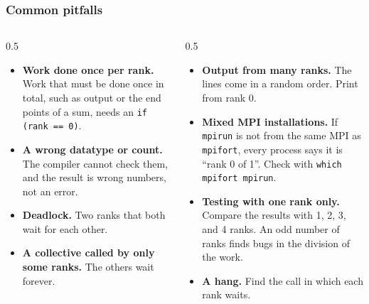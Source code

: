 \begin{frame}
  \frametitle{Common pitfalls}
  \begin{columns}[T]
    \begin{column}{0.5\textwidth}
      \begin{itemize}
        \item \textbf{Work done once per rank.} Work that must be done once in total, such as output or the end points of a sum, needs an \texttt{if (rank == 0)}.
        \item \textbf{A wrong datatype or count.} The compiler cannot check them, and the result is wrong numbers, not an error.
        \item \textbf{Deadlock.} Two ranks that both wait for each other.
        \item \textbf{A collective called by only some ranks.} The others wait forever.
      \end{itemize}
    \end{column}

    \begin{column}{0.5\textwidth}
      \begin{itemize}
        \item \textbf{Output from many ranks.} The lines come in a random order. Print from rank 0.
        \item \textbf{Mixed MPI installations.} If \texttt{mpirun} is not from the same MPI as \texttt{mpifort}, every process says it is ``rank 0 of 1''. Check with \texttt{which mpifort mpirun}.
        \item \textbf{Testing with one rank only.} Compare the results with 1, 2, 3, and 4 ranks. An odd number of ranks finds bugs in the division of the work.
        \item \textbf{A hang.} Find the call in which each rank waits.
      \end{itemize}
    \end{column}
  \end{columns}
\end{frame}


